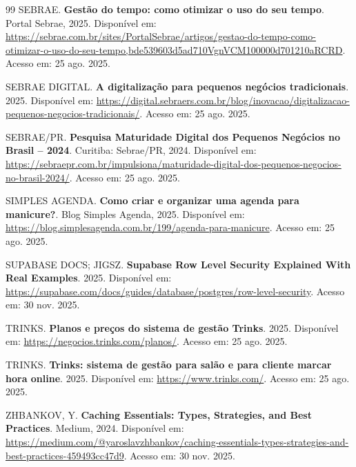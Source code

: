 \documentclass[12pt,a4paper]{article}
\begin{document}
\begin{thebibliography}{99}
SEBRAE. \textbf{Gestão do tempo: como otimizar o uso do seu tempo}. Portal Sebrae, 2025. Disponível em: \url{https://sebrae.com.br/sites/PortalSebrae/artigos/gestao-do-tempo-como-otimizar-o-uso-do-seu-tempo,bde539603d5ad710VgnVCM100000d701210aRCRD}. Acesso em: 25 ago. 2025.

SEBRAE DIGITAL. \textbf{A digitalização para pequenos negócios tradicionais}. 2025. Disponível em: \url{https://digital.sebraers.com.br/blog/inovacao/digitalizacao-pequenos-negocios-tradicionais/}. Acesso em: 25 ago. 2025.

SEBRAE/PR. \textbf{Pesquisa Maturidade Digital dos Pequenos Negócios no Brasil -- 2024}. Curitiba: Sebrae/PR, 2024. Disponível em: \url{https://sebraepr.com.br/impulsiona/maturidade-digital-dos-pequenos-negocios-no-brasil-2024/}. Acesso em: 25 ago. 2025.

SIMPLES AGENDA. \textbf{Como criar e organizar uma agenda para manicure?}. Blog Simples Agenda, 2025. Disponível em: \url{https://blog.simplesagenda.com.br/199/agenda-para-manicure}. Acesso em: 25 ago. 2025.

SUPABASE DOCS; JIGSZ. \textbf{Supabase Row Level Security Explained With Real Examples}. 2025. Disponível em: \url{https://supabase.com/docs/guides/database/postgres/row-level-security}. Acesso em: 30 nov. 2025.

TRINKS. \textbf{Planos e preços do sistema de gestão Trinks}. 2025. Disponível em: \url{https://negocios.trinks.com/planos/}. Acesso em: 25 ago. 2025.

TRINKS. \textbf{Trinks: sistema de gestão para salão e para cliente marcar hora online}. 2025. Disponível em: \url{https://www.trinks.com/}. Acesso em: 25 ago. 2025.

ZHBANKOV, Y. \textbf{Caching Essentials: Types, Strategies, and Best Practices}. Medium, 2024. Disponível em: \url{https://medium.com/@yaroslavzhbankov/caching-essentials-types-strategies-and-best-practices-459493cc47d9}. Acesso em: 30 nov. 2025.

\end{thebibliography}
\end{document}
